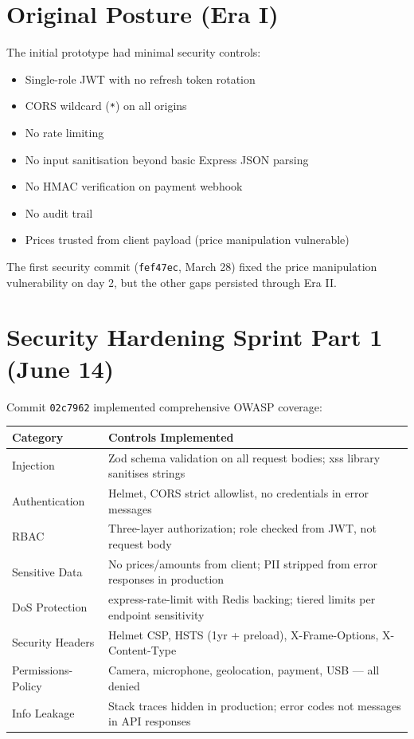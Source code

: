\documentclass[11pt,a4paper,twoside]{book}
\newcommand{\th}[1]{\textbf{\color{white}#1}}
\begin{document}
\section{Original Posture (Era I)}

The initial prototype had minimal security controls:

\begin{itemize}[leftmargin=1.4em]
  \item Single-role JWT with no refresh token rotation
  \item CORS wildcard (\texttt{*}) on all origins
  \item No rate limiting
  \item No input sanitisation beyond basic Express JSON parsing
  \item No HMAC verification on payment webhook
  \item No audit trail
  \item Prices trusted from client payload (price manipulation vulnerable)
\end{itemize}

The first security commit (\texttt{fef47ec}, March 28) fixed the price
manipulation vulnerability on day 2, but the other gaps persisted through Era II.

\section{Security Hardening Sprint Part 1 (June 14)}

Commit \texttt{02c7962} implemented comprehensive OWASP coverage:

\begin{center}\small
\begin{longtable}{p{4cm}p{8.5cm}}
\toprule
\rowcolor{headbg}\th{Category} & \th{Controls Implemented} \\
\midrule
Injection & Zod schema validation on all request bodies; xss library sanitises strings \\
\rowcolor{rowalt}Authentication & Helmet, CORS strict allowlist, no credentials in error messages \\
RBAC & Three-layer authorization; role checked from JWT, not request body \\
\rowcolor{rowalt}Sensitive Data & No prices/amounts from client; PII stripped from error responses in production \\
DoS Protection & express-rate-limit with Redis backing; tiered limits per endpoint sensitivity \\
\rowcolor{rowalt}Security Headers & Helmet CSP, HSTS (1yr + preload), X-Frame-Options, X-Content-Type \\
Permissions-Policy & Camera, microphone, geolocation, payment, USB — all denied \\
\rowcolor{rowalt}Info Leakage & Stack traces hidden in production; error codes not messages in API responses \\
\bottomrule
\end{longtable}
\end{center}
\end{document}
